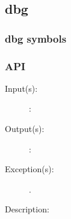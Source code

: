 %
%
%
%
%              

\subsection{dbg}
\label{dbg}

\subsubsection{dbg symbols}

\subsubsection{API}
\begin{description}
\label{dbg_}
\item[{\cfunc[]{dbg\_}{}}: ]
	\begin{description}\item[]
	\item[Input(s): ]
		\begin{description}\item[]
		\item[: ]
		\end{description}
	\item[Output(s): ]
		\begin{description}\item[]
		\item[: ]
		\end{description}
	\item[Exception(s): ]
		\begin{description}\item[]
		\item[.]
		\end{description}
	\item[Description: ]
	\end{description}
\end{description}
